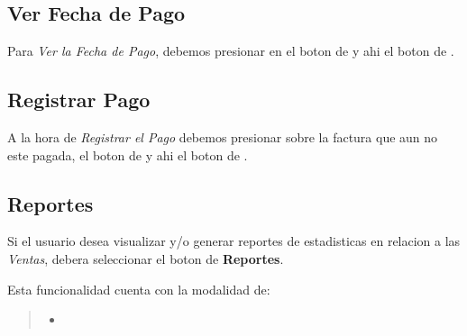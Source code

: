 \documentclass[a4paper,10pt,spanish]{sphinxmanual}
\begin{document}
\subsection{Ver Fecha de Pago}
\label{ventas:ver-fecha-de-pago}\label{ventas:ver-fecha-pago}
Para \emph{Ver la Fecha de Pago}, debemos presionar en el boton de  y ahi el boton de .



\subsection{Registrar Pago}
\label{ventas:registrar-pago}\label{ventas:id3}
A la hora de \emph{Registrar el Pago} debemos presionar sobre la factura que aun no este pagada, el boton de  y ahi el boton de .




\subsection{Reportes}
\label{ventas:id4}\label{ventas:reportes}
Si el usuario desea visualizar y/o generar reportes de estadisticas en relacion a las \emph{Ventas}, debera seleccionar el boton de \textbf{Reportes}.


Esta funcionalidad cuenta con la modalidad de:
\begin{quote}
\begin{itemize}
\item {} 
{\hyperref[ventas:top10\string-mont\string-vtas\string-pf]{}}

\end{itemize}
\label{ventas:top10-mont-vtas-pf}\end{quote}
\end{document}
